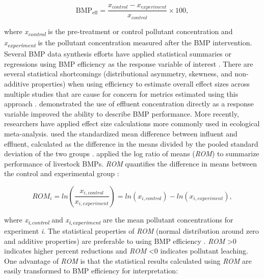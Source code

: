 \documentclass[utf8]{FrontiersinHarvard}
\begin{document}
\[
\text{BMP}_{\text{eff}}=\frac{x_{control}-x_{experiment}}{x_{control}}\times 100,
\]

where \emph{x\textsubscript{control}} is the pre-treatment or control pollutant concentration and \emph{x\textsubscript{experiment}} is the pollutant concentration measured after the BMP intervention.
Several BMP data synthesis efforts have applied statistical summaries or regressions using BMP efficiency as the response variable of interest \citep{agouridisLivestockGrazingManagement2005, claryBMPPerformanceAnalysis2011, kochNitrogenRemovalStormwater2014, krogerReviewBestManagement2012, liuReviewEffectivenessBest2017, simpsonDevelopingBestManagement2009}.
There are several statistical shortcomings (distributional asymmetry, skewness, and non-additive properties) when using efficiency to estimate overall effect sizes across multiple studies that are cause for concern for metrics estimated using this approach \citep{nuzzoPercentDifferencesAnother2018, coleStatisticsNotesWhat2017}.
\citet{barrettPerformanceComparisonStructural2005} demonstrated the use of effluent concentration directly as a response variable improved the ability to describe BMP performance.
More recently, researchers have applied effect size calculations more commonly used in ecological meta-analysis.
\citet{horvathEffectsRegionalClimate2023} used the standardized mean difference between influent and effluent, calculated as the difference in the means divided by the pooled standard deviation of the two groups \citep{hedgesStatisticalMethodsMetaanalysis1985}.
\citet{grudzinskiDoesRiparianFencing2020} applied the log ratio of means (\emph{ROM}) to summarize performance of livestock BMPs.
\emph{ROM} quantifies the difference in means between the control and experimental group \citep{hedgesMetaanalysisResponseRatios1999}:

\[
ROM_i = ln\left(\frac{x_{i,control}}{x_{i,experiment}}\right) = ln(x_{i, control})-ln(x_{i, experiment}),
\]

where \emph{x\textsubscript{i,control}} and \emph{x\textsubscript{i,experiment}} are the mean pollutant concentrations for experiment \emph{i}.
The statistical properties of \emph{ROM} (normal distribution around zero and additive properties) are preferable to using BMP efficiency \citep{osenbergEffectSizeEcological1997, hedgesMetaanalysisResponseRatios1999}.
\emph{ROM} \textgreater 0 indicates higher percent reductions and \emph{ROM} \textless 0 indicates pollutant leaching.
One advantage of \emph{ROM} is that the statistical results calculated using \emph{ROM} are easily transformed to BMP efficiency for interpretation:
\end{document}
